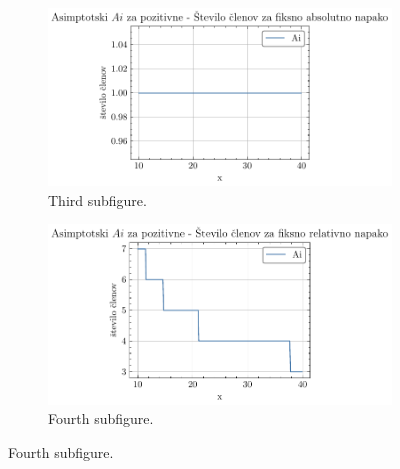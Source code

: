 \documentclass[slovene,11pt,a4paper]{article}
\begin{document}
\begin{figure}[H]
  \begin{subfigure}{0.48\textwidth}
    \centering
    \includegraphics[width=\linewidth]{graphs/pos_abs_err_n_ai.pdf}
    \caption{Third subfigure.}
    \label{fig:c}
  \end{subfigure}\hfill
  \begin{subfigure}{0.48\textwidth}
    \centering
    \includegraphics[width=\linewidth]{graphs/pos_rel_err_n_ai.pdf}
    \caption{Fourth subfigure.}
    \label{fig:d}
  \end{subfigure}


\end{figure}
\end{document}
